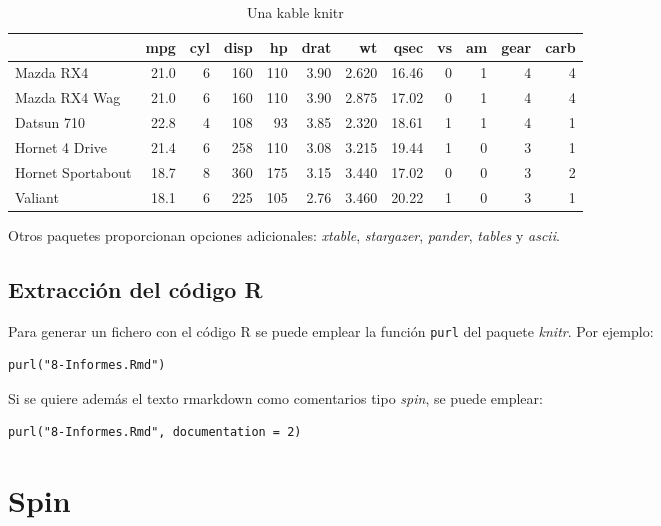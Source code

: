 \documentclass[
]{book}
\theoremstyle{break}
\theoremstyle{nonumberplain}
\begin{document}
\begin{table}

\caption{\label{tab:kable}Una kable knitr}
\centering
\begin{tabular}[t]{l|r|r|r|r|r|r|r|r|r|r|r}
\hline
  & mpg & cyl & disp & hp & drat & wt & qsec & vs & am & gear & carb\\
\hline
Mazda RX4 & 21.0 & 6 & 160 & 110 & 3.90 & 2.620 & 16.46 & 0 & 1 & 4 & 4\\
\hline
Mazda RX4 Wag & 21.0 & 6 & 160 & 110 & 3.90 & 2.875 & 17.02 & 0 & 1 & 4 & 4\\
\hline
Datsun 710 & 22.8 & 4 & 108 & 93 & 3.85 & 2.320 & 18.61 & 1 & 1 & 4 & 1\\
\hline
Hornet 4 Drive & 21.4 & 6 & 258 & 110 & 3.08 & 3.215 & 19.44 & 1 & 0 & 3 & 1\\
\hline
Hornet Sportabout & 18.7 & 8 & 360 & 175 & 3.15 & 3.440 & 17.02 & 0 & 0 & 3 & 2\\
\hline
Valiant & 18.1 & 6 & 225 & 105 & 2.76 & 3.460 & 20.22 & 1 & 0 & 3 & 1\\
\hline
\end{tabular}
\end{table}

Otros paquetes proporcionan opciones adicionales: \emph{xtable}, \emph{stargazer}, \emph{pander}, \emph{tables} y \emph{ascii}.

\hypertarget{extracciuxf3n-del-cuxf3digo-r}{%
\subsection{Extracción del código R}\label{extracciuxf3n-del-cuxf3digo-r}}

Para generar un fichero con el código R se puede emplear la función \texttt{purl} del paquete \emph{knitr}. Por ejemplo:

\begin{verbatim}
purl("8-Informes.Rmd")
\end{verbatim}

Si se quiere además el texto rmarkdown como comentarios tipo \emph{spin}, se puede emplear:

\begin{verbatim}
purl("8-Informes.Rmd", documentation = 2)
\end{verbatim}

\hypertarget{spin}{%
\section{Spin}\label{spin}}
\end{document}
